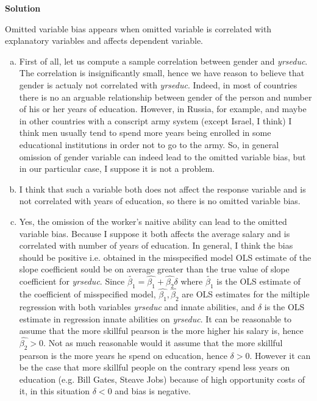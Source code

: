 \documentclass[a4paper]{article}
\begin{document}
\textbf{Solution}

Omitted variable bias appears when omitted variable is correlated with explanatory variables and affects dependent variable.
\begin{enumerate}[(a)]
	\item First of all, let us compute a sample correlation between gender and \textit{yrseduc}. The correlation is insignificantly small, hence we have reason to believe that gender is actualy not correlated with \textit{yrseduc}. Indeed, in most of countries there is no an arguable relationship between gender of the person and number of his or her years of education. However, in Russia, for example, and maybe in other countries with a conscript army system (except Israel, I think) I think men usually tend to spend more years being enrolled in some educational institutions in order not to go to the army. So, in general omission of gender variable can indeed lead to the omitted variable bias, but in our particular case, I suppose it is not a problem.
	\item I think that such a variable both does not affect the response variable and is not correlated with years of education, so there is no omitted variable bias.
	\item Yes, the omission of the worker's naitive ability can lead to the omitted variable bias. Because I suppose it both affects the average salary and is correlated with number of years of education. In general, I think the bias should be positive i.e. obtained in the misspecified model OLS estimate of the slope coefficient sould be on average greater than the true value of slope coefficient for \textit{yrseduc}. Since $\tilde{\beta_1} = \hat{\beta_1} + \hat{\beta_2} \delta$ where $\tilde{\beta_1}$ is the OLS estimate of the coefficient of misspecified model, $\hat{\beta_1}, \hat{\beta_2}$ are OLS estimates for the miltiple regression with both variables \textit{yrseduc} and innate abilities, and $\delta$ is the OLS estimate in regression innate abilities on \textit{yrseduc}. It can be reasonable to assume that the more skillful pearson is the more higher his salary is, hence $\hat{\beta_2} > 0$. Not as much reasonable would it assume that the more skillful pearson is the more years he spend on education, hence $\delta > 0$. However it can be the case that more skillful people on the contrary spend less years on education (e.g. Bill Gates, Steave Jobs) because of high opportunity costs of it, in this situation $\delta < 0$ and bias is negative.
\end{enumerate}
\end{document}
